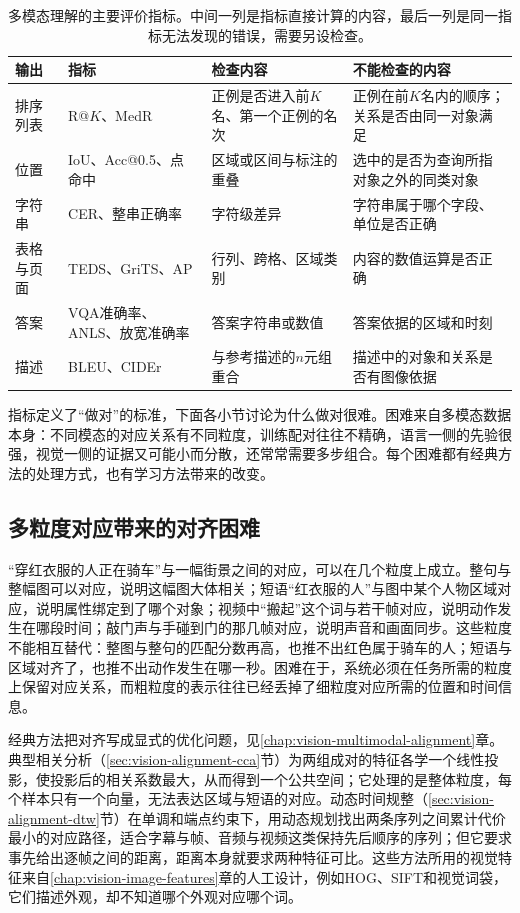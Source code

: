 \begin{table}[htbp]
  \centering
  \small
  \begin{tabularx}{\linewidth}{@{}p{14mm}p{20mm}XX@{}}
    \toprule
    输出 & 指标 & 检查内容 & 不能检查的内容\\
    \midrule
    排序列表 & R@$K$、MedR & 正例是否进入前$K$名、第一个正例的名次 & 正例在前$K$名内的顺序；关系是否由同一对象满足\\
    位置 & IoU、Acc@0.5、点命中 & 区域或区间与标注的重叠 & 选中的是否为查询所指对象之外的同类对象\\
    字符串 & CER、整串正确率 & 字符级差异 & 字符串属于哪个字段、单位是否正确\\
    表格与页面 & TEDS、GriTS、AP & 行列、跨格、区域类别 & 内容的数值运算是否正确\\
    答案 & VQA准确率、ANLS、放宽准确率 & 答案字符串或数值 & 答案依据的区域和时刻\\
    描述 & BLEU、CIDEr & 与参考描述的$n$元组重合 & 描述中的对象和关系是否有图像依据\\
    \bottomrule
  \end{tabularx}
  \caption{多模态理解的主要评价指标。中间一列是指标直接计算的内容，最后一列是同一指标无法发现的错误，需要另设检查。}
  \label{tab:vision-understanding-metrics}
\end{table}

指标定义了“做对”的标准，下面各小节讨论为什么做对很难。困难来自多模态数据本身：不同模态的对应关系有不同粒度，训练配对往往不精确，语言一侧的先验很强，视觉一侧的证据又可能小而分散，还常常需要多步组合。每个困难都有经典方法的处理方式，也有学习方法带来的改变。

\subsection{多粒度对应带来的对齐困难}
\label{sec:vision-understanding-challenge-granularity}

“穿红衣服的人正在骑车”与一幅街景之间的对应，可以在几个粒度上成立。整句与整幅图可以对应，说明这幅图大体相关；短语“红衣服的人”与图中某个人物区域对应，说明属性绑定到了哪个对象；视频中“搬起”这个词与若干帧对应，说明动作发生在哪段时间；敲门声与手碰到门的那几帧对应，说明声音和画面同步。这些粒度不能相互替代：整图与整句的匹配分数再高，也推不出红色属于骑车的人；短语与区域对齐了，也推不出动作发生在哪一秒。困难在于，系统必须在任务所需的粒度上保留对应关系，而粗粒度的表示往往已经丢掉了细粒度对应所需的位置和时间信息。

经典方法把对齐写成显式的优化问题，见\ref{chap:vision-multimodal-alignment}章。典型相关分析（\ref{sec:vision-alignment-cca}节）为两组成对的特征各学一个线性投影，使投影后的相关系数最大，从而得到一个公共空间；它处理的是整体粒度，每个样本只有一个向量，无法表达区域与短语的对应。动态时间规整（\ref{sec:vision-alignment-dtw}节）在单调和端点约束下，用动态规划找出两条序列之间累计代价最小的对应路径，适合字幕与帧、音频与视频这类保持先后顺序的序列；但它要求事先给出逐帧之间的距离，距离本身就要求两种特征可比。这些方法所用的视觉特征来自\ref{chap:vision-image-features}章的人工设计，例如HOG、SIFT和视觉词袋，它们描述外观，却不知道哪个外观对应哪个词。

